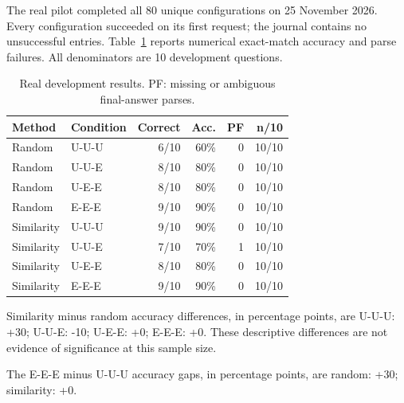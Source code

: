 The real pilot completed all 80 unique configurations on 25 November 2026. Every configuration succeeded on its first request; the journal contains no unsuccessful entries. Table~\ref{tab:pilot} reports numerical exact-match accuracy and parse failures. All denominators are 10 development questions.

\begin{table}[t]

\caption{Real development results. PF: missing or ambiguous final-answer parses.}

\label{tab:pilot}

\centering

\setlength{\tabcolsep}{3pt}

\begin{tabular}{llrrrr}

\toprule

Method & Condition & Correct & Acc. & PF & n/10 \\

\midrule

Random & U-U-U & 6/10 & 60\% & 0 & 10/10 \\

Random & U-U-E & 8/10 & 80\% & 0 & 10/10 \\

Random & U-E-E & 8/10 & 80\% & 0 & 10/10 \\

Random & E-E-E & 9/10 & 90\% & 0 & 10/10 \\

Similarity & U-U-U & 9/10 & 90\% & 0 & 10/10 \\

Similarity & U-U-E & 7/10 & 70\% & 1 & 10/10 \\

Similarity & U-E-E & 8/10 & 80\% & 0 & 10/10 \\

Similarity & E-E-E & 9/10 & 90\% & 0 & 10/10 \\

\bottomrule

\end{tabular}

\end{table}

Similarity minus random accuracy differences, in percentage points, are U-U-U: +30; U-U-E: -10; U-E-E: +0; E-E-E: +0. These descriptive differences are not evidence of significance at this sample size.

The E-E-E minus U-U-U accuracy gaps, in percentage points, are random: +30; similarity: +0.

